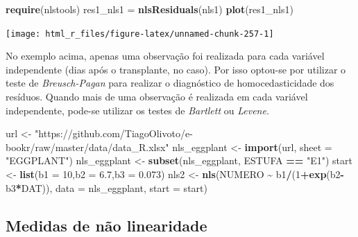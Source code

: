 \documentclass[
]{book}
\newenvironment{Shaded}{\begin{snugshade}}{\end{snugshade}}
\newcommand{\DataTypeTok}[1]{\textcolor[rgb]{0.13,0.29,0.53}{#1}}
\newcommand{\DecValTok}[1]{\textcolor[rgb]{0.00,0.00,0.81}{#1}}
\newcommand{\FloatTok}[1]{\textcolor[rgb]{0.00,0.00,0.81}{#1}}
\newcommand{\KeywordTok}[1]{\textcolor[rgb]{0.13,0.29,0.53}{\textbf{#1}}}
\newcommand{\NormalTok}[1]{#1}
\newcommand{\OperatorTok}[1]{\textcolor[rgb]{0.81,0.36,0.00}{\textbf{#1}}}
\newcommand{\StringTok}[1]{\textcolor[rgb]{0.31,0.60,0.02}{#1}}
\numberwithin{equation}{section}
\begin{document}
\begin{Shaded}
\begin{Highlighting}[]
\KeywordTok{require}\NormalTok{(nlstools)}
\NormalTok{res1\_nls1 =}\StringTok{ }\KeywordTok{nlsResiduals}\NormalTok{(nls1)}
\KeywordTok{plot}\NormalTok{(res1\_nls1)}
\end{Highlighting}
\end{Shaded}

\begin{center}\texttt{[image: html\_r\_files/figure-latex/unnamed-chunk-257-1]} \end{center}

No exemplo acima, apenas uma observação foi realizada para cada variável independente (dias após o transplante, no caso). Por isso optou-se por utilizar o teste de \emph{Breusch-Pagan} para realizar o diagnóstico de homocedasticidade dos resíduos. Quando mais de uma observação é realizada em cada variável independente, pode-se utilizar os testes de \emph{Bartlett} ou \emph{Levene}.

\begin{Shaded}
\begin{Highlighting}[]
\NormalTok{url \textless{}{-}}\StringTok{ "https://github.com/TiagoOlivoto/e{-}bookr/raw/master/data/data\_R.xlsx"}
\NormalTok{nls\_eggplant \textless{}{-}}\StringTok{ }\KeywordTok{import}\NormalTok{(url, }\DataTypeTok{sheet =} \StringTok{"EGGPLANT"}\NormalTok{)}
\NormalTok{nls\_eggplant \textless{}{-}}\StringTok{ }\KeywordTok{subset}\NormalTok{(nls\_eggplant, ESTUFA  }\OperatorTok{==}\StringTok{  "E1"}\NormalTok{) }
\NormalTok{start \textless{}{-}}\StringTok{ }\KeywordTok{list}\NormalTok{(}\DataTypeTok{b1 =} \DecValTok{10}\NormalTok{,}\DataTypeTok{b2 =} \FloatTok{6.7}\NormalTok{,}\DataTypeTok{b3 =} \FloatTok{0.073}\NormalTok{)}
\NormalTok{nls2 \textless{}{-}}\StringTok{ }\KeywordTok{nls}\NormalTok{(NUMERO }\OperatorTok{\textasciitilde{}}\StringTok{ }\NormalTok{b1}\OperatorTok{/}\NormalTok{(}\DecValTok{1}\OperatorTok{+}\KeywordTok{exp}\NormalTok{(b2}\OperatorTok{{-}}\NormalTok{b3}\OperatorTok{*}\NormalTok{DAT)), }
            \DataTypeTok{data =}\NormalTok{ nls\_eggplant,}
            \DataTypeTok{start =}\NormalTok{ start)}
\end{Highlighting}
\end{Shaded}

\hypertarget{medidas-de-nuxe3o-linearidade}{%
\subsection{Medidas de não linearidade}\label{medidas-de-nuxe3o-linearidade}}
\end{document}
